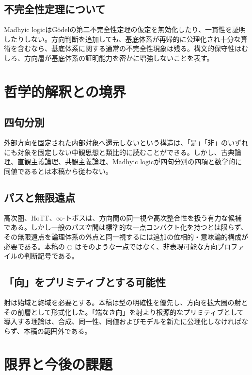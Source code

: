 \documentclass[a4paper,11pt]{ltjsarticle}
\theoremstyle{definition}
\theoremstyle{plain}
\newcommand{\dfix}{\bigcirc}
\begin{document}
\subsection{不完全性定理について}

Madhyic logicはGödelの第二不完全性定理の仮定を無効化したり、一貫性を証明したりしない。方向判断を追加しても、基底体系が再帰的に公理化され十分な算術を含むなら、基底体系に関する通常の不完全性現象は残る。構文的保守性はむしろ、方向層が基底体系の証明能力を密かに増強しないことを表す。

\section{哲学的解釈との境界}

\subsection{四句分別}

外部方向を固定された内部対象へ還元しないという構造は、「是」「非」のいずれにも対象を固定しない中観思想と類比的に読むことができる。しかし、古典論理、直観主義論理、共観主義論理、Madhyic logicが四句分別の四項と数学的に同値であるとは本稿から従わない。

\subsection{パスと無限遠点}

高次圏、HoTT、$\infty$-トポスは、方向間の同一視や高次整合性を扱う有力な候補である\cite{HoTT2013,KapulkinLumsdaine2021}。しかし一般のパス空間は標準的な一点コンパクト化を持つとは限らず、その無限遠点を論理体系の外点と同一視するには追加の位相的・意味論的構成が必要である。本稿の $\dfix$ はそのような一点ではなく、非表現可能な方向プロファイルの判断記号である。

\subsection{「向」をプリミティブとする可能性}

射は始域と終域を必要とする。本稿は型の明確性を優先し、方向を拡大圏の射とその前層として形式化した。「端なき向」を射より根源的なプリミティブとして導入する理論は、合成、同一性、同値およびモデルを新たに公理化しなければならず、本稿の範囲外である。

\section{限界と今後の課題}
\end{document}

